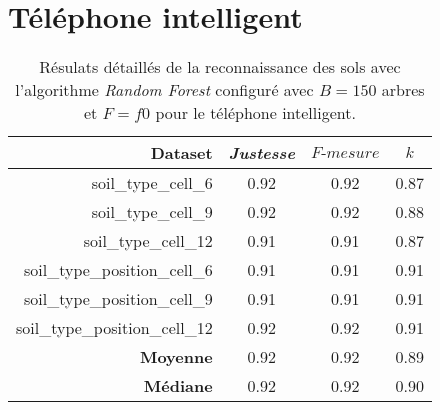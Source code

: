 \section{Téléphone intelligent}
\label{anx:a3}
\begin{table}[H]\renewcommand{\arraystretch}{0.5}
	\centering
	\caption{Résulats détaillés de la reconnaissance des sols avec l'algorithme \textit{Random Forest} configuré avec $B=150$ arbres et $F=f0$ pour le téléphone intelligent.}
	\label{tab:rf-150-f0-cell}
	\begin{tabular}{@{}rccc@{}}
		\toprule
			\textbf{Dataset} & \textit{Justesse} & $F\mbox{-} mesure$ & \textbf{$k$} \\
		\midrule
			soil\_type\_cell\_6 & 0.92 & 0.92 & 0.87 \\
			soil\_type\_cell\_9 & 0.92 & 0.92 & 0.88 \\
			soil\_type\_cell\_12 & 0.91 & 0.91 & 0.87 \\
			soil\_type\_position\_cell\_6 & 0.91 & 0.91 & 0.91 \\
			soil\_type\_position\_cell\_9 & 0.91 & 0.91 & 0.91 \\
			soil\_type\_position\_cell\_12 & 0.92 & 0.92 & 0.91 \\
			\textbf{Moyenne} & 0.92 & 0.92 & 0.89 \\
			\textbf{Médiane} & 0.92 & 0.92 & 0.90 \\
		\bottomrule
	\end{tabular}
\end{table}

